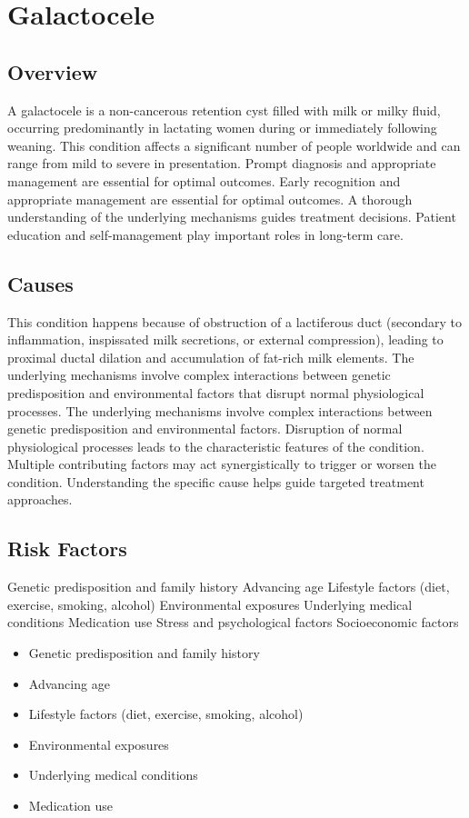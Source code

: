 \chapter{Galactocele}
\label{sec:Galactocele}

\section{Overview}
A galactocele is a non-cancerous retention cyst filled with milk or milky fluid, occurring predominantly in lactating women during or immediately following weaning. This condition affects a significant number of people worldwide and can range from mild to severe in presentation. Prompt diagnosis and appropriate management are essential for optimal outcomes. Early recognition and appropriate management are essential for optimal outcomes. A thorough understanding of the underlying mechanisms guides treatment decisions. Patient education and self-management play important roles in long-term care.
\section{Causes}
This condition happens because of obstruction of a lactiferous duct (secondary to inflammation, inspissated milk secretions, or external compression), leading to proximal ductal dilation and accumulation of fat-rich milk elements. The underlying mechanisms involve complex interactions between genetic predisposition and environmental factors that disrupt normal physiological processes. The underlying mechanisms involve complex interactions between genetic predisposition and environmental factors. Disruption of normal physiological processes leads to the characteristic features of the condition. Multiple contributing factors may act synergistically to trigger or worsen the condition. Understanding the specific cause helps guide targeted treatment approaches.
\section{Risk Factors}
Genetic predisposition and family history Advancing age Lifestyle factors (diet, exercise, smoking, alcohol) Environmental exposures Underlying medical conditions Medication use Stress and psychological factors Socioeconomic factors

\begin{itemize}[noitemsep]
  \item Genetic predisposition and family history
  \item Advancing age
  \item Lifestyle factors (diet, exercise, smoking, alcohol)
  \item Environmental exposures
  \item Underlying medical conditions
  \item Medication use
\end{itemize}
